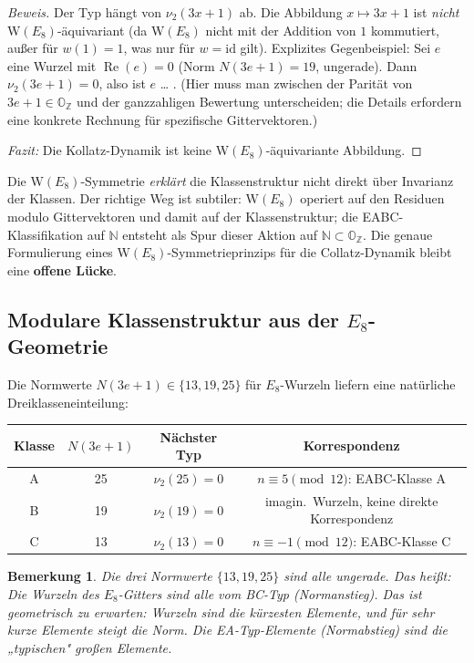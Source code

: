 \documentclass[12pt,a4paper]{article}
\newtheorem{bemerkung}[definition]{Bemerkung}
\newenvironment{beweis}{\begin{proof}[Beweis]}{\end{proof}}
\newcommand{\vii}{\nu_2}           %
\newcommand{\OZ}{\mathbb{O}_{\mathbb{Z}}}  %
\newcommand{\Norm}[1]{N(#1)}       %
\renewcommand{\Re}{\operatorname{Re}}
\newcommand{\WE}{\mathrm{W}(E_8)}  %
\newcommand{\N}{\mathbb{N}}
\begin{document}
\begin{beweis}
Der Typ hängt von $\vii(3x+1)$ ab. Die Abbildung $x \mapsto 3x+1$
ist \emph{nicht} $\WE$-äquivariant (da $\WE$ nicht mit der Addition
von $1$ kommutiert, außer für $w(1) = 1$, was nur für $w = \mathrm{id}$ gilt).
Explizites Gegenbeispiel: Sei $e$ eine Wurzel mit $\Re(e) = 0$
(Norm $\Norm{3e+1}=19$, ungerade). Dann $\vii(3e+1)=0$, also ist $e$ … .
(Hier muss man zwischen der Parität von $3e+1 \in \OZ$ und der ganzzahligen
Bewertung unterscheiden; die Details erfordern eine konkrete Rechnung
für spezifische Gittervektoren.)

\textit{Fazit:} Die Kollatz-Dynamik ist keine $\WE$-äquivariante Abbildung.
\end{beweis}

\begin{tcolorbox}[lücke]
Die $\WE$-Symmetrie \emph{erklärt} die Klassenstruktur nicht direkt
über Invarianz der Klassen. Der richtige Weg ist subtiler:
$\WE$ operiert auf den Residuen modulo Gittervektoren und damit
auf der Klassenstruktur; die EABC-Klassifikation auf $\N$ entsteht
als Spur dieser Aktion auf $\N \subset \OZ$.
Die genaue Formulierung eines $\WE$-Symmetrieprinzips für die
Collatz-Dynamik bleibt eine \textbf{offene Lücke}.
\end{tcolorbox}

\subsection{Modulare Klassenstruktur aus der $E_8$-Geometrie}

Die Normwerte $\Norm{3e+1} \in \{13, 19, 25\}$ für $E_8$-Wurzeln
liefern eine natürliche Dreiklasseneinteilung:

\begin{center}
\renewcommand{\arraystretch}{1.3}
\begin{tabular}{cccc}
\toprule
Klasse & $\Norm{3e+1}$ & Nächster Typ & Korrespondenz\\
\midrule
A & 25 & $\vii(25)=0$ & $n \equiv 5 \pmod{12}$: EABC-Klasse A\\
B & 19 & $\vii(19)=0$ & imagin.\ Wurzeln, keine direkte Korrespondenz\\
C & 13 & $\vii(13)=0$ & $n \equiv -1 \pmod{12}$: EABC-Klasse C\\
\bottomrule
\end{tabular}
\end{center}

\begin{bemerkung}
Die drei Normwerte $\{13, 19, 25\}$ sind alle ungerade.
Das heißt: Die Wurzeln des $E_8$-Gitters sind \emph{alle} vom BC-Typ
(Normanstieg). Das ist geometrisch zu erwarten: Wurzeln sind die
kürzesten Elemente, und für sehr kurze Elemente steigt die Norm.
Die EA-Typ-Elemente (Normabstieg) sind die „typischen" großen Elemente.
\end{bemerkung}
\end{document}
